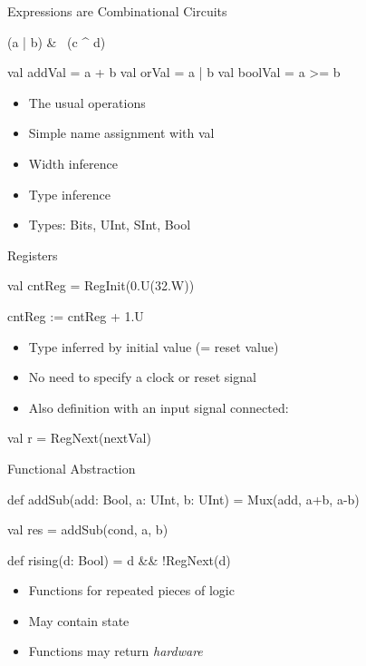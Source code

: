 \begin{frame}[fragile]{Expressions are Combinational Circuits}
\begin{chisel}
(a | b) & ~(c ^ d)

val addVal = a + b
val orVal = a | b
val boolVal = a >= b
\end{chisel}
\begin{itemize}
\item The usual operations 
\item Simple name assignment with val
\item Width inference
\item Type inference
\item Types: Bits, UInt, SInt, Bool
\end{itemize}
\end{frame}

\begin{frame}[fragile]{Registers}
\begin{chisel}
val cntReg = RegInit(0.U(32.W))

cntReg := cntReg + 1.U
\end{chisel}
\begin{itemize}
\item Type inferred by initial value (= reset value)
\item No need to specify a clock or reset signal
\end{itemize}
\begin{itemize}
\item Also definition with an input signal connected:
\end{itemize}
\begin{chisel}
val r = RegNext(nextVal) 
\end{chisel}
\end{frame}

\begin{frame}[fragile]{Functional Abstraction}
\begin{chisel}
  def addSub(add: Bool, a: UInt, b: UInt) =
    Mux(add, a+b, a-b)

  val res = addSub(cond, a, b)
  
  def rising(d: Bool) = d && !RegNext(d)
\end{chisel}
\begin{itemize}
\item Functions for repeated pieces of logic
\item May contain state
\item Functions may return \emph{hardware}
\end{itemize}
\end{frame}


